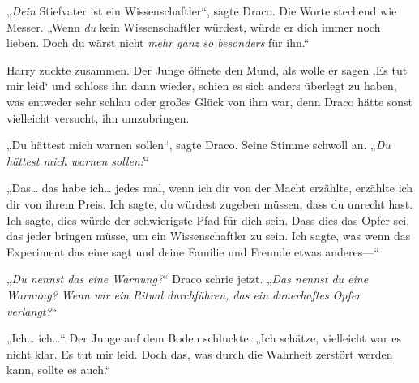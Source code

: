 „\emph{Dein} Stiefvater ist ein Wissenschaftler“, sagte Draco. Die Worte stechend wie Messer. „Wenn \emph{du} kein Wissenschaftler würdest, würde er dich immer noch lieben. Doch du wärst nicht \emph{mehr ganz so besonders} für ihn.“

Harry zuckte zusammen. Der Junge öffnete den Mund, als wolle er sagen ‚Es tut mir leid‘ und schloss ihn dann wieder, schien es sich anders überlegt zu haben, was entweder sehr schlau oder großes Glück von ihm war, denn Draco hätte sonst vielleicht versucht, ihn umzubringen.

„Du hättest mich warnen sollen“, sagte Draco. Seine Stimme schwoll an. „\emph{Du hättest mich warnen sollen!}“

„Das… das habe ich… jedes mal, wenn ich dir von der Macht erzählte, erzählte ich dir von ihrem Preis. Ich sagte, du würdest zugeben müssen, dass du unrecht hast. Ich sagte, dies würde der schwierigste Pfad für dich sein. Dass dies das Opfer sei, das jeder bringen müsse, um ein Wissenschaftler zu sein. Ich sagte, was wenn das Experiment das eine sagt und deine Familie und Freunde etwas anderes—“

„\emph{Du nennst das eine Warnung?}“ Draco schrie jetzt. „\emph{Das nennst du eine Warnung? Wenn wir ein Ritual durchführen, das ein dauerhaftes Opfer verlangt?}“

„Ich… ich…“ Der Junge auf dem Boden schluckte. „Ich schätze, vielleicht war es nicht klar. Es tut mir leid. Doch das, was durch die Wahrheit zerstört werden kann, sollte es auch.“

